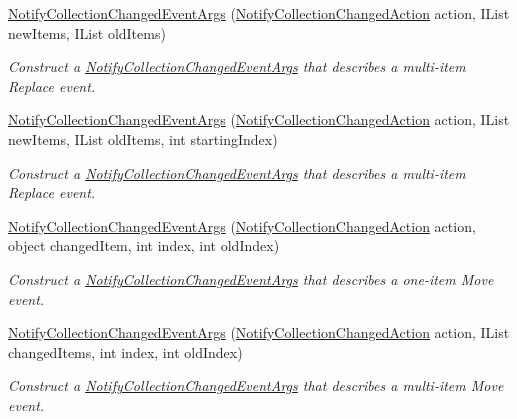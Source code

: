 \begin{DoxyCompactItemize}
\hyperlink{class_system_1_1_collections_1_1_specialized_1_1_notify_collection_changed_event_args_a19c4d46104ec7dec6f638f8a044cc4f3}{Notify\+Collection\+Changed\+Event\+Args} (\hyperlink{namespace_system_1_1_collections_1_1_specialized_a7e21ea761562ed22011c3120bbb31123}{Notify\+Collection\+Changed\+Action} action, I\+List new\+Items, I\+List old\+Items)
\begin{DoxyCompactList}\small\item\em Construct a \hyperlink{class_system_1_1_collections_1_1_specialized_1_1_notify_collection_changed_event_args}{Notify\+Collection\+Changed\+Event\+Args} that describes a multi-\/item Replace event. \end{DoxyCompactList}\item 
\hyperlink{class_system_1_1_collections_1_1_specialized_1_1_notify_collection_changed_event_args_a9a3025f2c4ec16eafd9f6456ee082588}{Notify\+Collection\+Changed\+Event\+Args} (\hyperlink{namespace_system_1_1_collections_1_1_specialized_a7e21ea761562ed22011c3120bbb31123}{Notify\+Collection\+Changed\+Action} action, I\+List new\+Items, I\+List old\+Items, int starting\+Index)
\begin{DoxyCompactList}\small\item\em Construct a \hyperlink{class_system_1_1_collections_1_1_specialized_1_1_notify_collection_changed_event_args}{Notify\+Collection\+Changed\+Event\+Args} that describes a multi-\/item Replace event. \end{DoxyCompactList}\item 
\hyperlink{class_system_1_1_collections_1_1_specialized_1_1_notify_collection_changed_event_args_a879fc58930942b2750663c35b411607d}{Notify\+Collection\+Changed\+Event\+Args} (\hyperlink{namespace_system_1_1_collections_1_1_specialized_a7e21ea761562ed22011c3120bbb31123}{Notify\+Collection\+Changed\+Action} action, object changed\+Item, int index, int old\+Index)
\begin{DoxyCompactList}\small\item\em Construct a \hyperlink{class_system_1_1_collections_1_1_specialized_1_1_notify_collection_changed_event_args}{Notify\+Collection\+Changed\+Event\+Args} that describes a one-\/item Move event. \end{DoxyCompactList}\item 
\hyperlink{class_system_1_1_collections_1_1_specialized_1_1_notify_collection_changed_event_args_a6fe4b64a1c7ebd237352558ad31379b8}{Notify\+Collection\+Changed\+Event\+Args} (\hyperlink{namespace_system_1_1_collections_1_1_specialized_a7e21ea761562ed22011c3120bbb31123}{Notify\+Collection\+Changed\+Action} action, I\+List changed\+Items, int index, int old\+Index)
\begin{DoxyCompactList}\small\item\em Construct a \hyperlink{class_system_1_1_collections_1_1_specialized_1_1_notify_collection_changed_event_args}{Notify\+Collection\+Changed\+Event\+Args} that describes a multi-\/item Move event. \end{DoxyCompactList}\end{DoxyCompactItemize}
